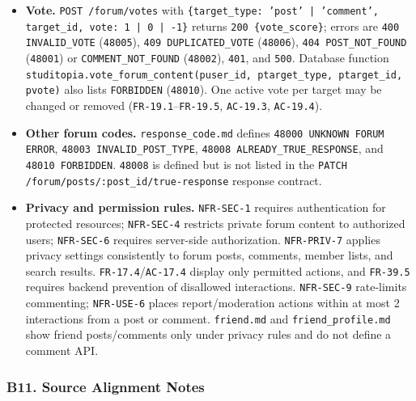\documentclass[12pt]{article}
\begin{document}
\begin{itemize}
\item \textbf{Vote.} \texttt{POST /forum/votes} with \texttt{\{target\_type: 'post' | 'comment', target\_id, vote: 1 | 0 | -1\}} returns \texttt{200 \{vote\_score\}}; errors are \texttt{400 INVALID\_VOTE} (\texttt{48005}), \texttt{409 DUPLICATED\_VOTE} (\texttt{48006}), \texttt{404 POST\_NOT\_FOUND} (\texttt{48001}) or \texttt{COMMENT\_NOT\_FOUND} (\texttt{48002}), \texttt{401}, and \texttt{500}. Database function \texttt{studitopia.vote\_forum\_content(puser\_id, ptarget\_type, ptarget\_id, pvote)} also lists \texttt{FORBIDDEN} (\texttt{48010}). One active vote per target may be changed or removed (\texttt{FR-19.1}--\texttt{FR-19.5}, \texttt{AC-19.3}, \texttt{AC-19.4}).
\item \textbf{Other forum codes.} \texttt{response\_code.md} defines \texttt{48000 UNKNOWN FORUM ERROR}, \texttt{48003 INVALID\_POST\_TYPE}, \texttt{48008 ALREADY\_TRUE\_RESPONSE}, and \texttt{48010 FORBIDDEN}. \texttt{48008} is defined but is not listed in the \texttt{PATCH /forum/posts/:post\_id/true-response} response contract.
\item \textbf{Privacy and permission rules.} \texttt{NFR-SEC-1} requires authentication for protected resources; \texttt{NFR-SEC-4} restricts private forum content to authorized users; \texttt{NFR-SEC-6} requires server-side authorization. \texttt{NFR-PRIV-7} applies privacy settings consistently to forum posts, comments, member lists, and search results. \texttt{FR-17.4}/\texttt{AC-17.4} display only permitted actions, and \texttt{FR-39.5} requires backend prevention of disallowed interactions. \texttt{NFR-SEC-9} rate-limits commenting; \texttt{NFR-USE-6} places report/moderation actions within at most 2 interactions from a post or comment. \texttt{friend.md} and \texttt{friend\_profile.md} show friend posts/comments only under privacy rules and do not define a comment API.
\end{itemize}
\par\medskip

\hypertarget{sec:b11-source-alignment-notes}{}
\subsubsection*{B11. Source Alignment Notes}
\par\medskip
\end{document}
